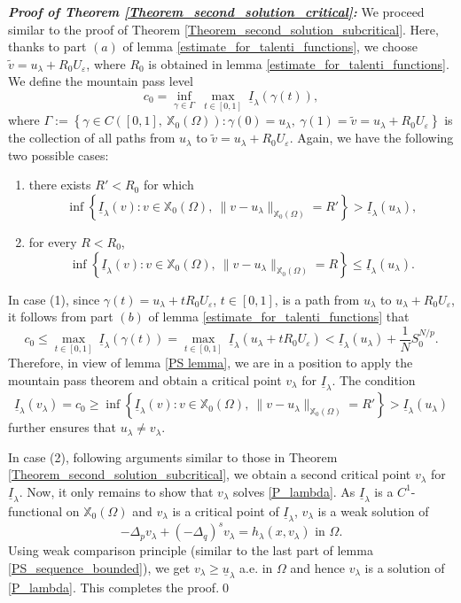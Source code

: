 \documentclass[reqno,oneside]{amsart}
\theoremstyle{definition}
\theoremstyle{remark}
\numberwithin{equation}{section}
\newcommand{\Om} {\Omega}
\newcommand{\p}{\Delta_p}
\newcommand{\qs}{(-\Delta_q)^s}
\newcommand{\xo}{\mathbb{X}_0}
\newcommand{\ti}{\underline{I}_{\la}}
\newcommand{\ue}{U_{\varepsilon}}
\newcommand{\la} {\lambda}
\begin{document}
\noindent\textbf{\textit{Proof of Theorem \ref{Theorem_second_solution_critical}:}} We proceed similar to the proof of Theorem \ref{Theorem_second_solution_subcritical}. Here, thanks to part $(a)$ of lemma \ref{estimate_for_talenti_functions}, we choose $\tilde{v} = u_{\la} + R_0 \ue$, where $R_0$ is obtained in lemma \ref{estimate_for_talenti_functions}. We define the mountain pass level
\[c_0 = \inf_{\gamma \in \Gamma}\ \max_{t\in [0,1]}\ \ti \left(\gamma(t) \right), \]
where $\Gamma:= \left\{ \gamma \in C \left([0,1],\ \xo(\Om) \right): \gamma(0)= u_{\la},\ \gamma(1)= \tilde{v}= u_{\la} + R_0 \ue \right\}$ is the collection of all paths from $u_{\la}$ to $\tilde{v} = u_{\la} + R_0 \ue$. Again, we have the following two possible cases:
\begin{enumerate}
    \item there exists $R'< R_0$ for which
    \[\inf \left\{ \ti(v): v\in \xo(\Om),\ \| v- u_{\la}\|_{\xo(\Om)} =R' \right\} > \ti (u_{\la}),\]

    \item for every $R<R_0$,
    \[\inf \left\{ \ti(v): v\in \xo(\Om),\ \| v- u_{\la}\|_{\xo(\Om)} =R \right\} \leq \ti (u_{\la}).\]
\end{enumerate}
In case (1), since $\gamma (t) = u_{\la} + t R_0 \ue$, $t\in[0,1]$, is a path from $u_{\la}$ to $u_{\la} + R_0 \ue$, it follows from part $(b)$ of lemma \ref{estimate_for_talenti_functions} that
\[c_0 \leq \max_{t\in [0,1]}\ \ti \left(\gamma (t) \right) = \max_{t\in [0,1]}\ \ti \left(u_{\la} + t R_0 \ue \right) < \ti \left( u_{\la} \right) + \frac{1}{N} S_0^{N/p}.\]
Therefore, in view of lemma \ref{PS lemma}, we are in a position to apply the mountain pass theorem and obtain a critical point $v_{\la}$ for $\ti$. The condition
\[\ti(v_{\la}) = c_0 \geq \inf \left\{ \ti(v): v\in \xo(\Om),\ \| v- u_{\la}\|_{\xo(\Om)} =R' \right\} > \ti (u_{\la})\]
further ensures that $u_{\la} \not= v_{\la}$.

In case (2), following arguments similar to those in Theorem \ref{Theorem_second_solution_subcritical}, we obtain a second critical point $v_{\la}$ for $\ti$. Now, it only remains to show that $v_{\la}$ solves \eqref{P_lambda}. As $\ti$ is a $C^1$-functional on $\xo(\Om)$ and $v_{\la}$ is a critical point of $\ti$, $v_{\la}$ is a weak solution of
\begin{equation}
    -\p v_{\la} + \qs v_{\la} = h_{\la} (x, v_{\la}) \text{ in } \Om.
\end{equation}
Using weak comparison principle (similar to the last part of lemma \ref{PS_sequence_bounded}), we get $v_{\la} \geq \underline{u}_{\la}$ a.e. in $\Om$ and hence $v_{\la}$ is a solution of \eqref{P_lambda}. This completes the proof.\hfill\qed
\end{document}
